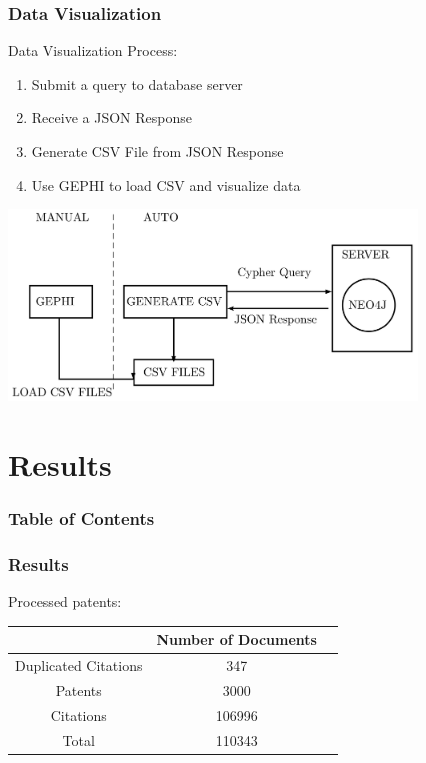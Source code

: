 \documentclass{beamer}
\begin{document}
\begin{frame}
\frametitle{Data Visualization}
Data Visualization Process:
\begin{enumerate}
\item Submit a query to database server
\item Receive a JSON Response
\item Generate CSV File from JSON Response
\item Use GEPHI to load CSV and visualize data
\end{enumerate}
\begin{center}
\includegraphics[height=2in]{gephi.png}
\end{center}
\end{frame}

\section{Results}
\begin{frame}
\frametitle{Table of Contents}
\tableofcontents[currentsection]
\end{frame}

\begin{frame}
\frametitle{Results}
Processed patents:
\begin{table}[htd]
\begin{tabular}{|c|c|l|} \hline
 &Number of Documents\\ \hline
 Duplicated Citations&347 \\ \hline
Patents&3000 \\ \hline
Citations&106996 \\ \hline
Total & 110343\\ \hline
\end{tabular}
\end{table}
\end{frame}
\end{document}
